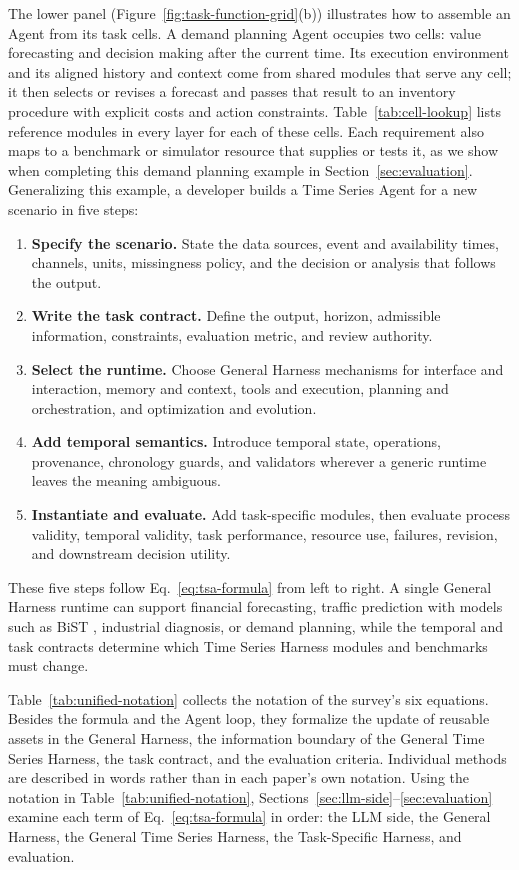 \documentclass[preprints,article,submit,moreauthors]{Definitions/mdpi}
\begin{document}
The lower panel (Figure~\ref{fig:task-function-grid}(b)) illustrates how to assemble an Agent from its task cells. A demand planning Agent occupies two cells: value forecasting and decision making after the current time. Its execution environment and its aligned history and context come from shared modules that serve any cell; it then selects or revises a forecast and passes that result to an inventory procedure with explicit costs and action constraints. Table~\ref{tab:cell-lookup} lists reference modules in every layer for each of these cells. Each requirement also maps to a benchmark or simulator resource that supplies or tests it, as we show when completing this demand planning example in Section~\ref{sec:evaluation}. Generalizing this example, a developer builds a Time Series Agent for a new scenario in five steps:

\begin{enumerate}
  \item \textbf{Specify the scenario.} State the data sources, event and availability times, channels, units, missingness policy, and the decision or analysis that follows the output.
  \item \textbf{Write the task contract.} Define the output, horizon, admissible information, constraints, evaluation metric, and review authority.
  \item \textbf{Select the runtime.} Choose General Harness mechanisms for interface and interaction, memory and context, tools and execution, planning and orchestration, and optimization and evolution.
  \item \textbf{Add temporal semantics.} Introduce temporal state, operations, provenance, chronology guards, and validators wherever a generic runtime leaves the meaning ambiguous.
  \item \textbf{Instantiate and evaluate.} Add task-specific modules, then evaluate process validity, temporal validity, task performance, resource use, failures, revision, and downstream decision utility.
\end{enumerate}

These five steps follow Eq.~\eqref{eq:tsa-formula} from left to right. A single General Harness runtime can support financial forecasting, traffic prediction with models such as BiST \citep{ma2025bist}, industrial diagnosis, or demand planning, while the temporal and task contracts determine which Time Series Harness modules and benchmarks must change.

Table~\ref{tab:unified-notation} collects the notation of the survey's six equations. Besides the formula and the Agent loop, they formalize the update of reusable assets in the General Harness, the information boundary of the General Time Series Harness, the task contract, and the evaluation criteria. Individual methods are described in words rather than in each paper's own notation. Using the notation in Table~\ref{tab:unified-notation}, Sections~\ref{sec:llm-side}--\ref{sec:evaluation} examine each term of Eq.~\eqref{eq:tsa-formula} in order: the LLM side, the General Harness, the General Time Series Harness, the Task-Specific Harness, and evaluation.
\end{document}
